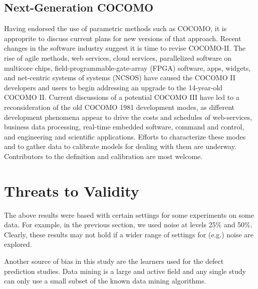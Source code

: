 \documentclass{sig-alternate}
\begin{document}
\subsection{Next-Generation COCOMO}


Having endorsed the use of parametric methods such as COCOMO, it is approprite
to discuss current plans for new versions of that approach.
Recent changes  in the software industry
suggest  it is time  to revise COCOMO-II.
The rise of agile methods, web
services, cloud services, parallelized software on
multicore chips, field-programmable-gate-array
(FPGA) software, apps, widgets, and net-centric
systems of systems (NCSOS) have caused the COCOMO II
developers and users to begin addressing an upgrade
to the 14-year-old COCOMO II. 
Current discussions
of a potential COCOMO III have led to a
reconsideration of the old COCOMO 1981 development
modes, as different development phenomena appear to
drive the costs and schedules of web-services,
business data processing, real-time embedded
software, command and control, and engineering and
scientific applications.
Efforts to characterize
these modes and to gather data to calibrate models
for dealing with them are underway. Contributors
to the definition and calibration are most  welcome.  


\section{Threats to Validity}

The above results were based with certain settings for some experiments on some data. 
For example, in the previous section, we used noise at levels 25\% and 50\%.
Clearly, these results may not hold if a wider range of settings for (e.g.) noise are explored.






Another source of bias in this study
are the learners used for the defect prediction
studies. Data mining is a large and active field and
any single study can only use a small subset of the
known data mining algorithms.  
\end{document}
